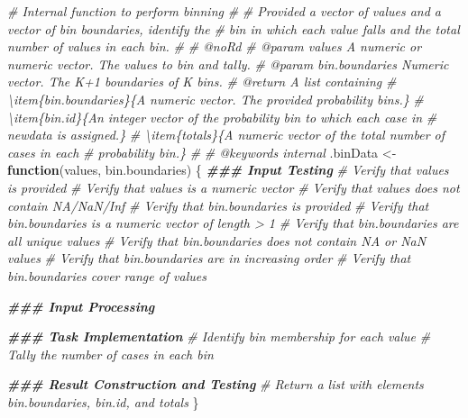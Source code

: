 \documentclass[
]{book}
\newenvironment{Shaded}{\begin{snugshade}}{\end{snugshade}}
\newcommand{\CommentTok}[1]{\textcolor[rgb]{0.56,0.35,0.01}{\textit{#1}}}
\newcommand{\ControlFlowTok}[1]{\textcolor[rgb]{0.13,0.29,0.53}{\textbf{#1}}}
\newcommand{\DocumentationTok}[1]{\textcolor[rgb]{0.56,0.35,0.01}{\textbf{\textit{#1}}}}
\newcommand{\NormalTok}[1]{#1}
\newcommand{\OtherTok}[1]{\textcolor[rgb]{0.56,0.35,0.01}{#1}}
\begin{document}
\begin{Shaded}
\begin{Highlighting}[]
\CommentTok{\#\textquotesingle{} Internal function to perform binning}
\CommentTok{\#\textquotesingle{} }
\CommentTok{\#\textquotesingle{} Provided a vector of values and a vector of bin boundaries, identify the }
\CommentTok{\#\textquotesingle{}   bin in which each value falls and the total number of values in each bin.}
\CommentTok{\#\textquotesingle{}}
\CommentTok{\#\textquotesingle{} @noRd}
\CommentTok{\#\textquotesingle{} @param values A numeric or numeric vector. The values to bin and tally.}
\CommentTok{\#\textquotesingle{} @param bin.boundaries Numeric vector. The K+1 boundaries of K bins.}
\CommentTok{\#\textquotesingle{} @return A list containing}
\CommentTok{\#\textquotesingle{} \textbackslash{}item\{bin.boundaries\}\{A numeric vector. The provided probability bins.\}}
\CommentTok{\#\textquotesingle{} \textbackslash{}item\{bin.id\}\{An integer vector of the probability bin to which each case in }
\CommentTok{\#\textquotesingle{}   \textasciigrave{}newdata\textasciigrave{} is assigned.\}}
\CommentTok{\#\textquotesingle{} \textbackslash{}item\{totals\}\{A numeric vector of the total number of cases in each }
\CommentTok{\#\textquotesingle{}   probability bin.\}}
\CommentTok{\#\textquotesingle{} }
\CommentTok{\#\textquotesingle{} @keywords internal}
\NormalTok{.binData }\OtherTok{\textless{}{-}} \ControlFlowTok{function}\NormalTok{(values, bin.boundaries) \{}
  \DocumentationTok{\#\#\# Input Testing}
  \CommentTok{\# Verify that \textasciigrave{}values\textasciigrave{} is provided}
  \CommentTok{\# Verify that \textasciigrave{}values\textasciigrave{} is a numeric vector}
  \CommentTok{\# Verify that \textasciigrave{}values\textasciigrave{} does not contain NA/NaN/Inf}
  \CommentTok{\# Verify that \textasciigrave{}bin.boundaries\textasciigrave{} is provided}
  \CommentTok{\# Verify that \textasciigrave{}bin.boundaries\textasciigrave{} is a numeric vector of length \textgreater{} 1}
  \CommentTok{\# Verify that \textasciigrave{}bin.boundaries\textasciigrave{} are all unique values}
  \CommentTok{\# Verify that \textasciigrave{}bin.boundaries\textasciigrave{} does not contain NA or NaN values}
  \CommentTok{\# Verify that \textasciigrave{}bin.boundaries\textasciigrave{} are in increasing order}
  \CommentTok{\# Verify that \textasciigrave{}bin.boundaries\textasciigrave{} cover range of \textasciigrave{}values\textasciigrave{}}
  
  \DocumentationTok{\#\#\# Input Processing}
  
  \DocumentationTok{\#\#\# Task Implementation}
  \CommentTok{\# Identify bin membership for each value}
  \CommentTok{\# Tally the number of cases in each bin}

  \DocumentationTok{\#\#\# Result Construction and Testing}
  \CommentTok{\# Return a list with elements \textasciigrave{}bin.boundaries\textasciigrave{}, \textasciigrave{}bin.id\textasciigrave{}, and \textasciigrave{}totals\textasciigrave{}}
\NormalTok{\}}
\end{Highlighting}
\end{Shaded}
\end{document}
